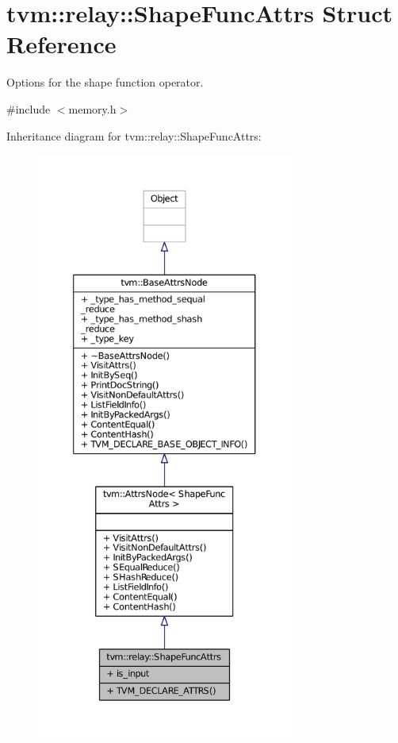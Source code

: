 \hypertarget{structtvm_1_1relay_1_1ShapeFuncAttrs}{}\section{tvm\+:\+:relay\+:\+:Shape\+Func\+Attrs Struct Reference}
\label{structtvm_1_1relay_1_1ShapeFuncAttrs}


Options for the shape function operator.  




{\ttfamily \#include $<$memory.\+h$>$}



Inheritance diagram for tvm\+:\+:relay\+:\+:Shape\+Func\+Attrs\+:
\nopagebreak
\begin{figure}[H]
\begin{center}
\leavevmode
\includegraphics[height=550pt]{structtvm_1_1relay_1_1ShapeFuncAttrs__inherit__graph}
\end{center}
\end{figure}


